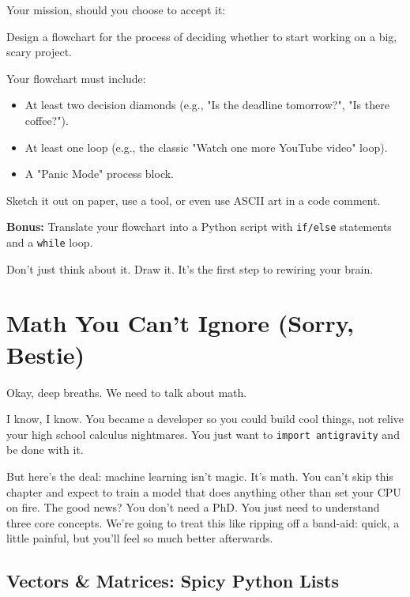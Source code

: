 \documentclass[11pt, letterpaper, openany]{book}
\begin{document}
\begin{challengebox}
Your mission, should you choose to accept it:

Design a flowchart for the process of deciding whether to start working on a big, scary project.

Your flowchart must include:
\begin{itemize}
    \item At least two decision diamonds (e.g., "Is the deadline tomorrow?", "Is there coffee?").
    \item At least one loop (e.g., the classic "Watch one more YouTube video" loop).
    \item A "Panic Mode" process block.
\end{itemize}
Sketch it out on paper, use a tool, or even use ASCII art in a code comment.

\textbf{Bonus:} Translate your flowchart into a Python script with \texttt{if/else} statements and a \texttt{while} loop.

Don't just think about it. Draw it. It's the first step to rewiring your brain.
\end{challengebox}

\chapter{Math You Can’t Ignore (Sorry, Bestie)}

Okay, deep breaths. We need to talk about math.

I know, I know. You became a developer so you could build cool things, not relive your high school calculus nightmares. You just want to \texttt{import antigravity} and be done with it.

But here's the deal: machine learning isn't magic. It's math. You can't skip this chapter and expect to train a model that does anything other than set your CPU on fire. The good news? You don't need a PhD. You just need to understand three core concepts. We're going to treat this like ripping off a band-aid: quick, a little painful, but you'll feel so much better afterwards.

\section{Vectors \& Matrices: Spicy Python Lists}
\end{document}
